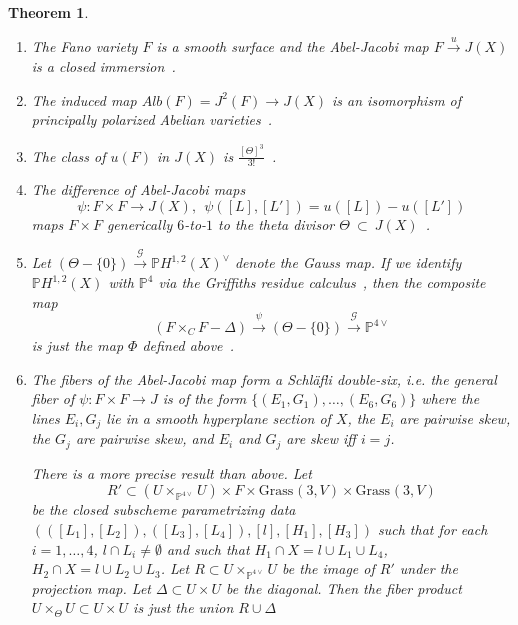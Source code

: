 \documentclass[amssymb,twoside,12 pt,amscd,reqno]{amsart}
\theoremstyle{plain}
\newtheorem{thm}{Theorem}[section]
\theoremstyle{definition}
\newcommand{\PP}{\mathbb{P}}
\newcommand{\GR}[3]{\text{Grass}_{#1}(#2,#3)}
\newcommand{\lt}{\left}
\newcommand{\rt}{\right}
\begin{document}
\begin{thm} \label{thm-cg}
\begin{enumerate} 

\item The Fano variety $F$ is a smooth surface and the 
Abel-Jacobi
map $F\xrightarrow{u} J(X)$ is a closed immersion~\cite[theorem 7.8,
theorem 12.37]{CG}. 

\item The induced map $Alb(F)=J^2(F)\rightarrow J(X)$ is an isomorphism of 
principally polarized Abelian varieties~\cite[theorem 11.19]{CG}.
\item The class of $u(F)$ in $J(X)$
is $\frac{[\Theta]^3}{3!}$~\cite[proposition 13.1]{CG}.

\item The difference of 
Abel-Jacobi maps 
\begin{equation}
\psi:F\times F \rightarrow J(X), \ \ \psi([L],[L']) = u([L]) - u([L'])
\end{equation}
maps $F\times F$ generically $6$-to-$1$ to the theta divisor
$\Theta~\subset ~J(X)$~\cite[section 13]{CG}.

\item Let $(\Theta-\{0\}) \xrightarrow{\mathcal{G}} 
\PP H^{1,2}(X)^\vee$ denote the Gauss map.  If we identify
$\PP H^{1,2}(X)$ with $\PP^4$ via the
Griffiths residue calculus~\cite{GR}, then the composite map
\begin{equation}
(F\times_C F-\Delta)\xrightarrow{\psi}(\Theta -\{0\})\xrightarrow{\mathcal{G}}
\PP^{4\vee}
\end{equation}
is just the map $\Phi$ defined above~\cite[formula 13.6]{CG}.

\item The fibers of the Abel-Jacobi map form a \emph{ Schl\"afli
double-six}, i.e. the general fiber of $\psi:F\times F\rightarrow J$
is of the form $\{(E_1,G_1),\dots,(E_6,G_6)\}$ where the lines
$E_i,G_j$ lie in a smooth hyperplane section of $X$, the $E_i$ are
pairwise skew, the $G_j$ are pairwise skew, and $E_i$ and $G_j$ are
skew iff $i=j$.  

There is a more precise result than above.  Let 
\begin{equation}R' \subset \lt(U\times_{\PP^{4\vee}} U\rt) \times F \times
\GR{}{3}{V}\times \GR{}{3}{V}\end{equation} 
be the closed subscheme parametrizing data
$\lt(\lt([L_1],[L_2]\rt),\lt([L_3],[L_4]\rt),[l], [H_1], [H_3]\rt)$
such that for each $i=1,\dots,4$, $l\cap L_i\neq\emptyset$ and such
that $H_1\cap X = l\cup L_1\cup L_4$, $H_2\cap X = l\cup L_2\cup L_3$.
Let $R\subset U\times_{\PP^{4\vee}} U$ be the image of $R'$ under the
projection map.  Let $\Delta\subset U\times U$ be the diagonal.  Then
the fiber product $U\times_\Theta U\subset U\times U$ is just the
union $R\cup\Delta$~\cite[p. 347-348]{CG}


\end{enumerate}
\end{thm}
\end{document}
